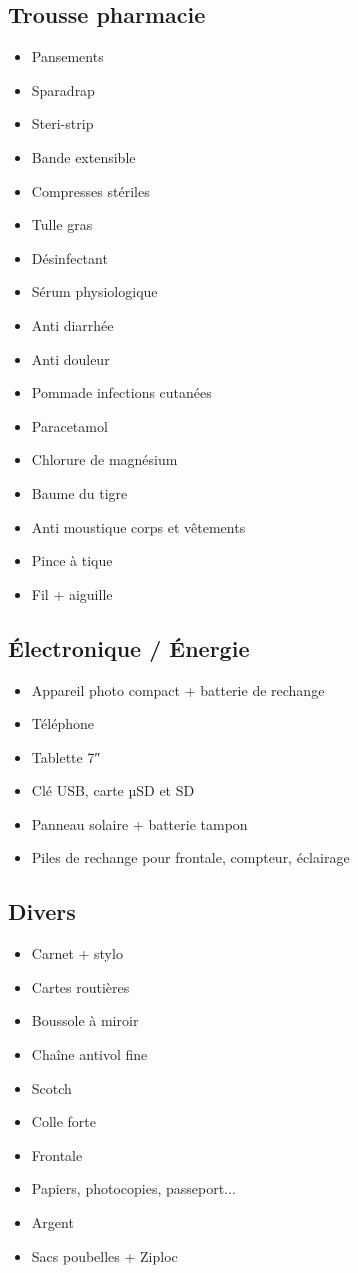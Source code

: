   \subsection*{Trousse pharmacie}
 \begin{itemize}
 \item Pansements
 \item Sparadrap
 \item Steri-strip
 \item Bande extensible
 \item Compresses stériles
 \item Tulle gras
 \item Désinfectant
 \item Sérum physiologique
 \item Anti diarrhée
 \item Anti douleur
 \item Pommade infections cutanées
 \item Paracetamol
 \item Chlorure de magnésium
 \item Baume du tigre
 \item Anti moustique corps et vêtements
 \item Pince à tique
 \item Fil + aiguille
 \end{itemize}
 
  \subsection*{Électronique / Énergie}
 \begin{itemize}
 \item Appareil photo compact + batterie de rechange
 \item Téléphone
 \item Tablette 7″
 \item Clé USB, carte µSD et SD
 \item Panneau solaire + batterie tampon
 \item Piles de rechange pour frontale, compteur, éclairage
 \end{itemize}
 
  \subsection*{Divers}
 \begin{itemize}
 \item Carnet + stylo
 \item Cartes routières
 \item Boussole à miroir
 \item Chaîne antivol fine
 \item Scotch
 \item Colle forte
 \item Frontale
 \item Papiers, photocopies, passeport...
 \item Argent
 \item Sacs poubelles + Ziploc
 \end{itemize}
